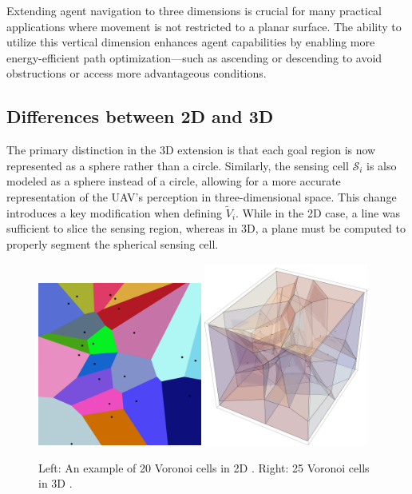         Extending agent navigation to three dimensions is crucial for many practical applications where movement is not restricted to a planar surface.
        The ability to utilize this vertical dimension enhances agent capabilities by enabling more energy-efficient path optimization—such as ascending or descending to avoid obstructions or access more advantageous conditions.


    \subsection{Differences between 2D and 3D}
        The primary distinction in the 3D extension is that each goal region is now represented as a sphere rather than a circle.  
        Similarly, the sensing cell $\mathcal{S}_i$ is also modeled as a sphere instead of a circle, allowing for a more accurate representation of the \ac{UAV}'s perception in three-dimensional space.  
        This change introduces a key modification when defining $\tilde{V}_i$.
        While in the 2D case, a line was sufficient to slice the sensing region, whereas in 3D, a plane must be computed to properly segment the spherical sensing cell. 
        
        \begin{figure}[H]
            \centering
            \includegraphics[width=0.48\textwidth, height=0.48\textwidth]{./fig/diagrams/Euclidean_Voronoi_diagram.jpg}
            \includegraphics[width=0.48\textwidth, height=0.48\textwidth]{./fig/diagrams/Euclidian Voronoi diagram 3d.png}
            \caption{
                Left: An example of 20 Voronoi cells in 2D \cite{Voronoi2d}. Right: 25 Voronoi cells in 3D \cite{Voronoi3d}.
            }
            \label{fig:voronoi_diagrams}
        \end{figure}
    

